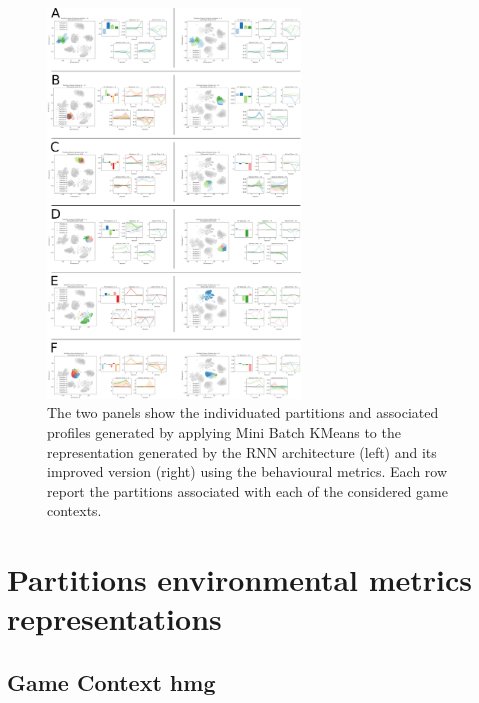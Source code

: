 \begin{figure}[!htb]
\includegraphics[width=0.6\textwidth]{images/appendix_D/clust_beha_all.png}
\centering
\caption[\textbf{Partitions of the representations generated by the RNN architecture and its improved version from the behavioural metrics}]{The two panels show the individuated partitions and associated profiles generated by applying Mini Batch KMeans to the representation generated by the RNN architecture (left) and its improved version (right) using the behavioural metrics. Each row report the partitions associated with each of the considered game contexts.}
\end{figure}
\FloatBarrier

\section{Partitions environmental metrics representations}
\label{partitions_environmental}

\subsection{Game Context hmg}
\label{env_clust_hmg}

